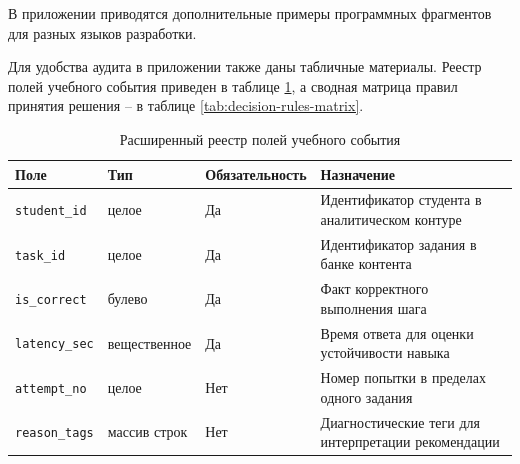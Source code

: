 В приложении приводятся дополнительные примеры программных фрагментов для
разных языков разработки.

Для удобства аудита в приложении также даны табличные материалы. Реестр полей
учебного события приведен в таблице \ref{tab:event-fields-registry}, а сводная
матрица правил принятия решения -- в таблице \ref{tab:decision-rules-matrix}.

\begin{table}[htbp]
  \caption{Расширенный реестр полей учебного события}
  \label{tab:event-fields-registry}
  \centering

  \begin{tabular}{|p{}|p{}|p{}|p{}|}
    \hline
    Поле & Тип & Обязательность & Назначение \\
    \hline
    \texttt{student\_id} & целое & Да & Идентификатор студента в аналитическом контуре \\
    \hline
    \texttt{task\_id} & целое & Да & Идентификатор задания в банке контента \\
    \hline
    \texttt{is\_correct} & булево & Да & Факт корректного выполнения шага \\
    \hline
    \texttt{latency\_sec} & вещественное & Да & Время ответа для оценки устойчивости навыка \\
    \hline
    \texttt{attempt\_no} & целое & Нет & Номер попытки в пределах одного задания \\
    \hline
    \texttt{reason\_tags} & массив строк & Нет & Диагностические теги для интерпретации рекомендации \\
    \hline
  \end{tabular}
\end{table}

